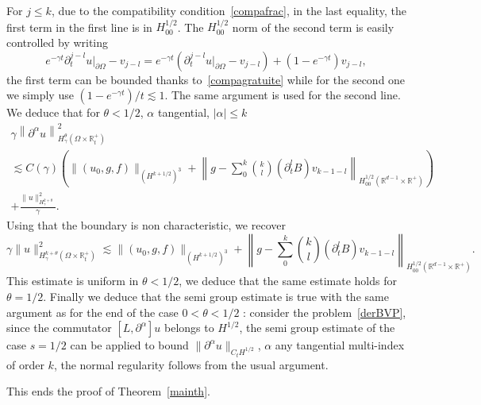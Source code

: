 \documentclass[AHL,Unicode,longabstracts,published]{cedram}
\newcommand{\R}{\mathbb{R}}
\begin{document}
\endgroup
For $j\leq k$, due to the compatibility condition~\eqref{compafrac}, in the last equality, the first term in the first line is in $H^{1/2}_{00}$. The $H^{1/2}_{00}$ norm of the second term is easily controlled by writing
\[
e^{-\gamma t}\partial_t^{j-l}u|_{\partial\Omega}-v_{j-l} =e^{-\gamma t}\left(\partial_t^{j-l}u|_{\partial\Omega}- v_{j-l}\right)+\left(1-e^{-\gamma t}\right)v_{j-l},
\]
the first term can be bounded thanks to~\eqref{compagratuite} while for the second one we simply use $(1-e^{-\gamma t})/t
\lesssim 1$. The same argument is used for the second line. We deduce that for $\theta <1/2$, $\alpha$ tangential, $|\alpha|\leq k$
\begin{multline*}
\gamma\left\|\partial^\alpha u\right\|^2 _{H^{\theta}_\gamma\left(\Omega\times \R_t^+\right)} \\
\lesssim C(\gamma)\left(\|(u_0,g,f)\|_{\left(H^{k+1/2}\right)^3} +\left\|g -\sum_0^k\binom{k}{l}\left(\partial_t^lB\right) v_{k-1-l}\right\|_{H^{1/2}_{00} \left(\R^{d-1}\times \R^+\right)}\right)\\
+\frac{\|u\|_{H^{k+\theta}_\gamma}^2}{\gamma}.
\end{multline*}
Using that the boundary is non characteristic, we recover
\[
\gamma\|u\|^2 _{H^{k+\theta}_\gamma\left(\Omega\times \R_t^+\right)} \lesssim \|(u_0,g,f)\|_{\left(H^{k+1/2}\right)^3} +\left\|g -\sum_0^k\binom{k}{l}(\partial_t^lB) v_{k-1-l}\right\|_{H^{1/2}_{00} \left(\R^{d-1}\times \R^+\right)}.
\]
This estimate is uniform in $\theta <1/2$, we deduce that the same estimate holds for $\theta =1/2$. Finally we deduce that the semi group estimate is true with the same argument as for the end of the case $0<\theta <1/2$ : consider the problem~\eqref{derBVP}, since the commutator $[L,\partial^\alpha]u$ belongs to $H^{1/2}$, the semi group estimate of the case $s=1/2$ can be applied to bound $\|\partial^\alpha u\|_{C_tH^{1/2}}$, $\alpha$ any tangential multi-index of order $k$, the normal regularity follows from the usual argument.


This ends the proof of Theorem~\ref{mainth}.
\end{document}
